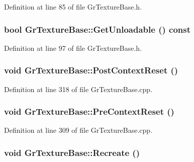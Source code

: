 \begin{CompactItemize}
Definition at line 85 of file GrTextureBase.h.\hypertarget{class_gr_texture_base_23cf8ef52445d659a710959b6a387eee}{
\subsubsection[{GetUnloadable}]{\setlength{\rightskip}{0pt plus 5cm}bool GrTextureBase::GetUnloadable () const}}
\label{class_gr_texture_base_23cf8ef52445d659a710959b6a387eee}




Definition at line 97 of file GrTextureBase.h.\hypertarget{class_gr_texture_base_80d48b8534d812f3b452a32087e3ac74}{
\subsubsection[{PostContextReset}]{\setlength{\rightskip}{0pt plus 5cm}void GrTextureBase::PostContextReset ()}}
\label{class_gr_texture_base_80d48b8534d812f3b452a32087e3ac74}




Definition at line 318 of file GrTextureBase.cpp.\hypertarget{class_gr_texture_base_e926c5f732cafa47d1336cc9b7637a44}{
\subsubsection[{PreContextReset}]{\setlength{\rightskip}{0pt plus 5cm}void GrTextureBase::PreContextReset ()}}
\label{class_gr_texture_base_e926c5f732cafa47d1336cc9b7637a44}




Definition at line 309 of file GrTextureBase.cpp.\hypertarget{class_gr_texture_base_b2752d6e88cda86e8c45b601941aa9b5}{
\subsubsection[{Recreate}]{\setlength{\rightskip}{0pt plus 5cm}void GrTextureBase::Recreate ()}}
\label{class_gr_texture_base_b2752d6e88cda86e8c45b601941aa9b5}





\end{CompactItemize}
